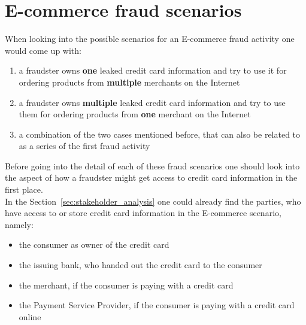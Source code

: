 
\section{E-commerce fraud scenarios}
\label{sec:scenario_fraud}

When looking into the possible scenarios for an E-commerce fraud activity one would come up with:\@

\begin{enumerate}
  \item a fraudster owns \textbf{one} leaked credit card information and try to use it for ordering products from \textbf{multiple} merchants on the Internet
  \item a fraudster owns \textbf{multiple} leaked credit card information and try to use them for ordering products from \textbf{one} merchant on the Internet
  \item a combination of the two cases mentioned before, that can also be related to as a series of the first fraud activity
\end{enumerate}

Before going into the detail of each of these fraud scenarios one should look into the aspect of how a fraudster might get access to credit card information in the first place. \\

In the Section~\ref{sec:stakeholder_analysis} one could already find the parties, who have access to or store credit card information in the E-commerce scenario, namely:\@

\begin{itemize}
  \item the consumer as owner of the credit card
  \item the issuing bank, who handed out the credit card to the consumer
  \item the merchant, if the consumer is paying with a credit card
  \item the Payment Service Provider, if the consumer is paying with a credit card online
\end{itemize}

